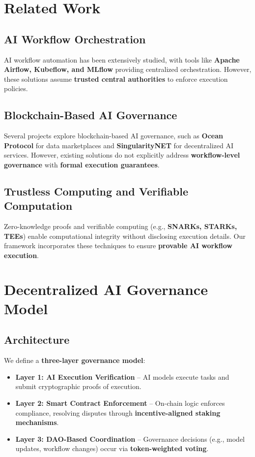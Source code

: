 \documentclass{article}
\begin{document}
\section{Related Work}
\subsection{AI Workflow Orchestration}
AI workflow automation has been extensively studied, with tools like \textbf{Apache Airflow, Kubeflow, and MLflow} providing centralized orchestration. However, these solutions assume \textbf{trusted central authorities} to enforce execution policies.

\subsection{Blockchain-Based AI Governance}
Several projects explore blockchain-based AI governance, such as \textbf{Ocean Protocol} for data marketplaces and \textbf{SingularityNET} for decentralized AI services. However, existing solutions do not explicitly address \textbf{workflow-level governance} with \textbf{formal execution guarantees}.

\subsection{Trustless Computing and Verifiable Computation}
Zero-knowledge proofs and verifiable computing (e.g., \textbf{SNARKs, STARKs, TEEs}) enable computational integrity without disclosing execution details. Our framework incorporates these techniques to ensure \textbf{provable AI workflow execution}.

\section{Decentralized AI Governance Model}
\subsection{Architecture}
We define a \textbf{three-layer governance model}:
\begin{itemize}
    \item \textbf{Layer 1: AI Execution Verification} – AI models execute tasks and submit cryptographic proofs of execution.
    \item \textbf{Layer 2: Smart Contract Enforcement} – On-chain logic enforces compliance, resolving disputes through \textbf{incentive-aligned staking mechanisms}.
    \item \textbf{Layer 3: DAO-Based Coordination} – Governance decisions (e.g., model updates, workflow changes) occur via \textbf{token-weighted voting}.
\end{itemize}
\end{document}
